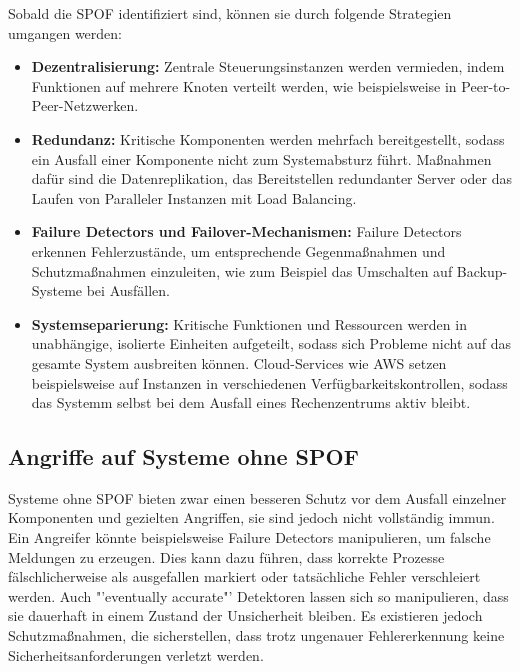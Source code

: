 \documentclass[a4paper,12pt]{article}
\begin{document}
Sobald die \ac{SPOF} identifiziert sind, können sie durch folgende Strategien umgangen werden:

\begin{itemize}
    \item \textbf{Dezentralisierung:} Zentrale Steuerungsinstanzen werden vermieden, indem Funktionen auf mehrere Knoten verteilt werden, wie beispielsweise in Peer-to-Peer-Netzwerken.
    \item \textbf{Redundanz:} Kritische Komponenten werden mehrfach bereitgestellt, sodass ein Ausfall einer Komponente nicht zum Systemabsturz führt. Maßnahmen dafür sind die Datenreplikation, das Bereitstellen redundanter Server oder das Laufen von Paralleler Instanzen mit Load Balancing.
    \item \textbf{Failure Detectors und Failover-Mechanismen:} Failure Detectors erkennen Fehlerzustände, um entsprechende Gegenmaßnahmen und Schutzmaßnahmen einzuleiten, wie zum Beispiel das Umschalten auf Backup-Systeme bei Ausfällen.
    \item \textbf{Systemseparierung:} Kritische Funktionen und Ressourcen werden in unabhängige, isolierte Einheiten aufgeteilt, sodass sich Probleme nicht auf das gesamte System ausbreiten können. Cloud-Services wie AWS setzen beispielsweise auf Instanzen in verschiedenen Verfügbarkeitskontrollen, sodass das Systemm selbst bei dem Ausfall eines Rechenzentrums aktiv bleibt.
\end{itemize}

\subsection{Angriffe auf Systeme ohne SPOF}
Systeme ohne \ac{SPOF} bieten zwar einen besseren Schutz vor dem Ausfall einzelner Komponenten und gezielten Angriffen, sie sind jedoch nicht vollständig immun. Ein Angreifer könnte beispielsweise Failure Detectors manipulieren, um falsche Meldungen zu erzeugen. Dies kann dazu führen, dass korrekte Prozesse fälschlicherweise als ausgefallen markiert oder tatsächliche Fehler verschleiert werden. Auch "'eventually accurate"' Detektoren lassen sich so manipulieren, dass sie dauerhaft in einem Zustand der Unsicherheit bleiben. Es existieren jedoch Schutzmaßnahmen, die sicherstellen, dass trotz ungenauer Fehlererkennung keine Sicherheitsanforderungen verletzt werden. \cite{10.1145/1052796.1052806}
\end{document}
